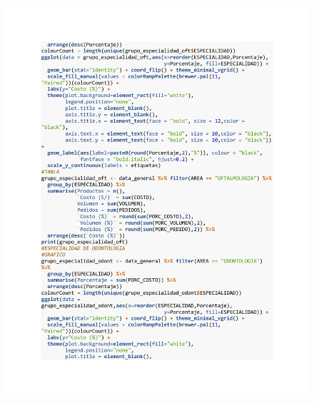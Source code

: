 \begin{figure}[h!]
        \begin{tcolorbox}[colback=white, colframe=black, boxrule=1.5pt, sharp corners=all]
            {\includegraphics[width=\linewidth, height=22cm, trim=2.5cm 2.75cm 2.5cm 2.5cm, clip]{images/script3.pdf}}
        \end{tcolorbox}
\end{figure}

